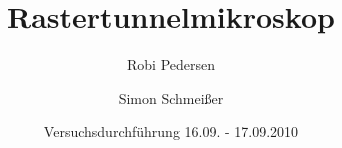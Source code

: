 \documentclass[a4paper,oneside]{scrartcl} %
\title{Rastertunnelmikroskop}
\author{Robi Pedersen \and Simon Schmeißer}
\date{Versuchsdurchführung 16.09. - 17.09.2010}
\begin{document}
\begin{titlepage}
  \maketitle
  \vfill
  \thispagestyle{empty}
\end{titlepage}

\tableofcontents
\clearpage









\clearpage

% 
%
\end{document}
